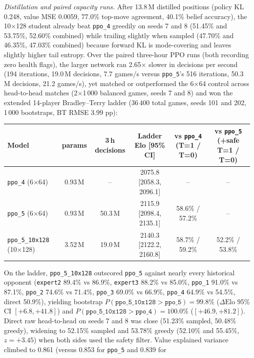 \emph{Distillation and paired capacity runs.} After 13.8\,M distilled positions (policy KL 0.248,
value MSE 0.0059, 77.0\% top-move agreement, 40.1\% belief accuracy), the 10$\times$128 student
already beat \texttt{ppo\_4} greedily on seeds 7 and 8 (51.45\% and 53.75\%, 52.60\% combined)
while trailing slightly when sampled (47.70\% and 46.35\%, 47.03\% combined) because forward KL is
mode-covering and leaves slightly higher tail entropy. Over the paired three-hour PPO runs (both
recording zero health flags), the larger network ran 2.65$\times$ slower in decisions per second
(194 iterations, 19.0\,M decisions, 7.7 games/s versus \texttt{ppo\_5}'s 516 iterations, 50.3\,M
decisions, 21.2 games/s), yet matched or outperformed the 6$\times$64 control across head-to-head
matches (2$\times$1\,000 balanced games, seeds 7 and 8) and won the extended 14-player
Bradley--Terry ladder (36\,400 total games, seeds 101 and 202, 1\,000 bootstraps, BT RMSE 3.99 pp):
\begin{center}
\small
\begin{tabular}{lccccc}
\toprule
Model & params & 3\,h decisions & Ladder Elo [95\% CI] & vs \texttt{ppo\_4} (T=1 / T=0) & vs \texttt{ppo\_5} (+safe T=1 / T=0) \\
\midrule
\texttt{ppo\_4} (6$\times$64)       & 0.93\,M & --       & 2075.8 [2058.3, 2096.1] & --                & -- \\
\texttt{ppo\_5} (6$\times$64)       & 0.93\,M & 50.3\,M  & 2115.9 [2098.4, 2135.1] & 58.6\% / 57.2\%   & -- \\
\texttt{ppo\_5\_10x128} (10$\times$128) & 3.52\,M & 19.0\,M & 2140.3 [2122.2, 2160.8] & 58.7\% / 59.2\% & 52.2\% / 53.8\% \\
\bottomrule
\end{tabular}
\end{center}
On the ladder, \texttt{ppo\_5\_10x128} outscored \texttt{ppo\_5} against nearly every historical
opponent (\texttt{expert2} 89.4\% vs 86.9\%, \texttt{expert3} 88.2\% vs 85.0\%, \texttt{ppo\_1}
91.0\% vs 87.1\%, \texttt{ppo\_2} 74.6\% vs 71.4\%, \texttt{ppo\_3} 69.0\% vs 66.9\%,
\texttt{ppo\_4} 64.9\% vs 54.5\%, direct 50.9\%), yielding bootstrap $P(\texttt{ppo\_5\_10x128} >
\texttt{ppo\_5}) = 99.8\%$ ($\Delta\text{Elo}$ 95\% CI $[+6.8, +41.8]$) and
$P(\texttt{ppo\_5\_10x128} > \texttt{ppo\_4}) = 100.0\%$ ($[+46.9, +81.2]$). Direct raw
head-to-head on seeds 7 and 8 was close (51.23\% sampled, 50.48\% greedy), widening to 52.15\%
sampled and 53.78\% greedy (52.10\% and 55.45\%, $z = +3.45$) when both sides used the safety
filter. Value explained variance climbed to 0.861 (versus 0.853 for \texttt{ppo\_5} and 0.839 for

